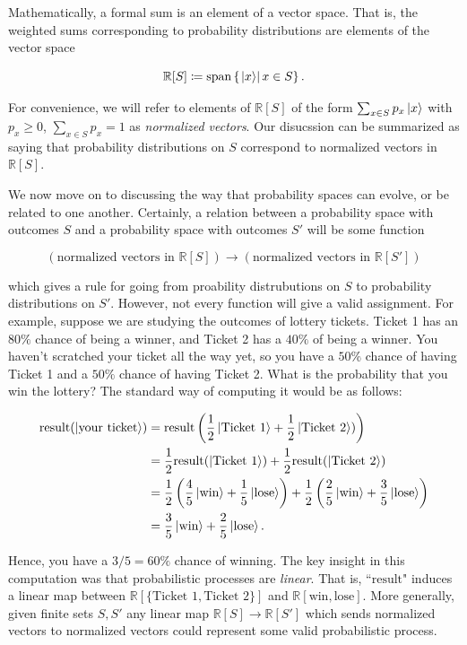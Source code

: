 \documentclass{article}
\theoremstyle{definition}
\newcommand{\RR}{\mathbb{R}}
\newcommand{\0}{\left|0\right>}
\newcommand{\1}{\left|1\right>}
\numberwithin{figure}{section}
\begin{document}
Mathematically, a formal sum is an element of a vector space. That is, the weighted sums corresponding to probability distributions are elements of the vector space

$$\RR[S]\coloneqq \text{span} \left\{\left.\ket{x}\right| x\in S\right\}.$$

For convenience, we will refer to elements of $\RR[S]$ of the form $\sum_{x\in S}p_x \ket{x}$ with $p_x\geq 0$, $\sum_{x\in S}p_x=1$ as \textit{normalized vectors}. Our disucssion can be summarized as saying that probability distributions on $S$ correspond to normalized vectors in $\RR[S]$.

We now move on to discussing the way that probability spaces can evolve, or be related to one another. Certainly, a relation between a probability space with outcomes $S$ and a probability space with outcomes $S'$ will be some function

$$\left(\text{normalized vectors in }\RR[S]\right)\xrightarrow{}\left(\text{normalized vectors in }\RR[S']\right)$$

which gives a rule for going from proability distrubutions on $S$ to probability distributions on $S'$. However, not every function will give a valid assignment. For example, suppose we are studying the outcomes of lottery tickets. Ticket 1 has an $80\%$ chance of being a winner, and Ticket 2 has a $40\%$ of being a winner. You haven't scratched your ticket all the way yet, so you have a $50\%$ chance of having Ticket 1 and a $50\%$ chance of having Ticket 2. What is the probability that you win the lottery? The standard way of computing it would be as follows:

\begin{align*}
\text{result}(\ket{\text{your ticket}})&=\text{result}\left(\frac{1}{2}\ket{\text{Ticket 1}}+\frac{1}{2}\ket{\text{Ticket 2}})\right)\\
&=\frac{1}{2}\text{result}(\ket{\text{Ticket 1}})+\frac{1}{2}\text{result}(\ket{\text{Ticket 2}})\\
&=\frac{1}{2}\left(\frac{4}{5}\ket{\text{win}}+\frac{1}{5}\ket{\text{lose}}\right)+\frac{1}{2}\left(\frac{2}{5}\ket{\text{win}}+\frac{3}{5}\ket{\text{lose}}\right)\\
&=\frac{3}{5}\ket{\text{win}}+\frac{2}{5}\ket{\text{lose}}.
\end{align*}

Hence, you have a $3/5=60\%$ chance of winning. The key insight in this computation was that probabilistic processes are \textit{linear}. That is, ``$\text{result}$" induces a linear map between $\RR[\{\text{Ticket 1}, \text{Ticket 2}\}]$ and $\RR[\text{win},\text{lose}]$. More generally, given finite sets $S,S'$ any linear map $\RR[S]\to\RR[S']$ which sends normalized vectors to normalized vectors could represent some valid probabilistic process.
\end{document}
